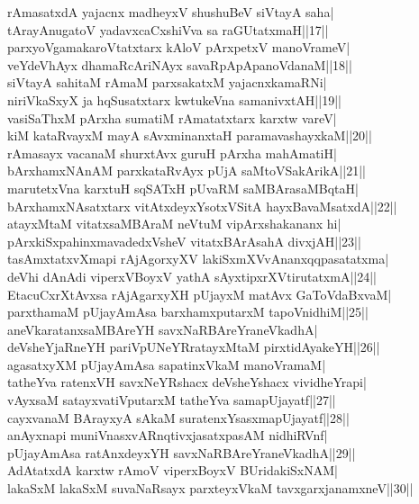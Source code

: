 \documentclass{article}
\begin{document}
rAmasatxdA yajacnx madheyxV shushuBeV siVtayA saha|\\
tArayAnugatoV yadavxcaCxshiVva sa raGUtatxmaH||17||\\
parxyoVgamakaroVtatxtarx kAloV pArxpetxV manoVrameV|\\
veYdeVhAyx dhamaRcAriNAyx savaRpApApanoVdanaM||18||\\
siVtayA sahitaM rAmaM parxsakatxM yajacnxkamaRNi|\\
niriVkaSxyX ja hqSusatxtarx kwtukeVna samanivxtAH||19||\\
vasiSaThxM pArxha sumatiM rAmatatxtarx karxtw vareV|\\
kiM kataRvayxM mayA sAvxminanxtaH paramavashayxkaM||20||\\
rAmasayx vacanaM shurxtAvx guruH pArxha mahAmatiH|\\
bArxhamxNAnAM parxkataRvAyx pUjA saMtoVSakArikA||21||\\
marutetxVna karxtuH sqSATxH pUvaRM saMBArasaMBqtaH|\\
bArxhamxNAsatxtarx vitAtxdeyxYsotxVSitA hayxBavaMsatxdA||22||\\
atayxMtaM vitatxsaMBAraM neVtuM vipArxshakananx hi|\\
pArxkiSxpahinxmavadedxVsheV vitatxBArAsahA divxjAH||23||\\
tasAmxtatxvXmapi rAjAgorxyXV lakiSxmXVvAnanxqqpasatatxma|\\
deVhi dAnAdi viperxVBoyxV yathA sAyxtipxrXVtirutatxmA||24||\\
EtacuCxrXtAvxsa rAjAgarxyXH pUjayxM matAvx GaToVdaBxvaM|\\
parxthamaM pUjayAmAsa barxhamxputarxM tapoVnidhiM||25||\\
aneVkaratanxsaMBAreYH savxNaRBAreYraneVkadhA|\\
deVsheYjaRneYH pariVpUNeYRratayxMtaM pirxtidAyakeYH||26||\\
agasatxyXM pUjayAmAsa sapatinxVkaM manoVramaM|\\
tatheYva ratenxVH savxNeYRshacx deVsheYshacx vividheYrapi|\\
vAyxsaM satayxvatiVputarxM tatheYva samapUjayatf||27||\\
cayxvanaM BArayxyA sAkaM suratenxYsasxmapUjayatf||28||\\
anAyxnapi muniVnasxvARnqtivxjasatxpasAM nidhiRVnf|\\
pUjayAmAsa ratAnxdeyxYH savxNaRBAreYraneVkadhA||29||\\
AdAtatxdA karxtw rAmoV viperxBoyxV BUridakiSxNAM|\\
lakaSxM lakaSxM suvaNaRsayx parxteyxVkaM tavxgarxjanamxneV||30||\\
\end{document}
